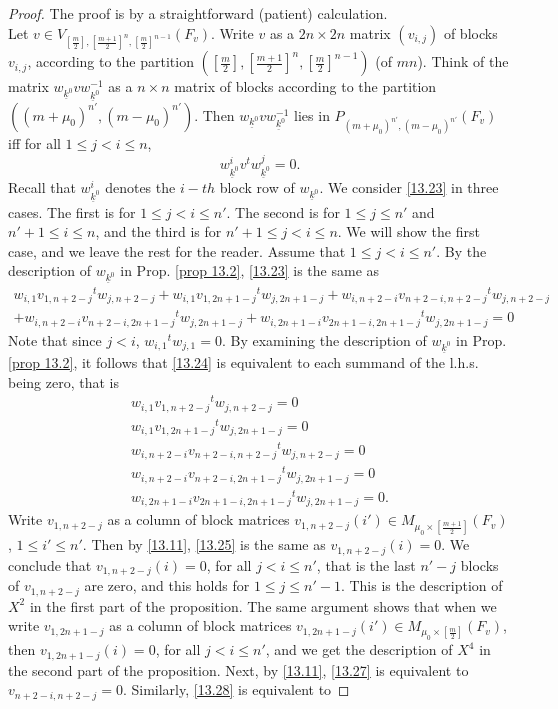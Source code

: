 \documentclass[12pts]{amsart}
\begin{document}
\begin{proof}
The proof is by a straightforward (patient) calculation.\\ 
Let $v\in V_{[\frac{m}{2}],[\frac{m+1}{2}]^n,[\frac{m}{2}]^{n-1}}(F_v)$. Write $v$ as a $2n\times 2n$ matrix $(v_{i,j})$ of blocks $v_{i,j}$, according to the partition $([\frac{m}{2}],[\frac{m+1}{2}]^n,[\frac{m}{2}]^{n-1})$ (of $mn$). Think of the matrix $w_{\underline{k}^0}vw^{-1}_{\underline{k}^0}$ as a $n\times n$ matrix of blocks according to the partition\\ $((m+\mu_0)^{n'},(m-\mu_0)^{n'})$. Then $w_{\underline{k}^0}vw^{-1}_{\underline{k}^0}$ lies in $P_{(m+\mu_0)^{n'},(m-\mu_0)^{n'}}(F_v)$ iff for all $1\leq j<i\leq n$,
\begin{equation}\label{13.23}
w^i_{\underline{k}^0}v{}^tw^j_{\underline{k}^0}=0.
\end{equation}
Recall that $w^i_{\underline{k}^0}$ denotes the $i-th$ block row of $w_{\underline{k}^0}$. We consider \eqref{13.23} in three cases. The first is for $1\leq j<i\leq n'$. The second is for $1\leq j\leq n'$ and $n'+1\leq i\leq n$, and the third is for $n'+1\leq j<i\leq n$. We will show the first case, and we leave the rest for the reader. Assume that $1\leq j<i\leq n'$. By the description of $w_{\underline{k}^0}$ in Prop. \ref{prop 13.2}, \eqref{13.23} is the same as
\begin{multline}\label{13.24}
w_{i,1}v_{1,n+2-j}{}^tw_{j,n+2-j}+w_{i,1}v_{1,2n+1-j}{}^tw_{j,2n+1-j}+
w_{i,n+2-i}v_{n+2-i,n+2-j}{}^tw_{j,n+2-j}\\
+w_{i,n+2-i}v_{n+2-i,2n+1-j}{}^tw_{j,2n+1-j}+w_{i,2n+1-i}v_{2n+1-i,2n+1-j}{}^tw_{j,2n+1-j}=0
\end{multline}	
Note that since $j<i$, $w_{i,1}{}^tw_{j,1}=0$. By examining the description of $w_{\underline{k}^0}$ in Prop. \ref{prop 13.2}, it follows that \eqref{13.24} is equivalent to each summand of the l.h.s. being zero, that is
\begin{eqnarray}
 w_{i,1}v_{1,n+2-j}{}^tw_{j,n+2-j}=0\label{13.25}\\
 w_{i,1}v_{1,2n+1-j}{}^tw_{j,2n+1-j}=0 \label{13.26}\\
 w_{i,n+2-i}v_{n+2-i,n+2-j}{}^tw_{j,n+2-j}=0 \label{13.27}\\
 w_{i,n+2-i}v_{n+2-i,2n+1-j}{}^tw_{j,2n+1-j}=0 \label{13.28} \\
 w_{i,2n+1-i}v_{2n+1-i,2n+1-j}{}^tw_{j,2n+1-j}=0 \label{13.29}.
\end{eqnarray}	
Write $v_{1,n+2-j}$ as a column of block matrices $v_{1,n+2-j}(i')\in M_{\mu_0\times [\frac{m+1}{2}]}(F_v)$, $1\leq i'\leq n'$. Then by \eqref{13.11}, \eqref{13.25} is the same as $v_{1,n+2-j}(i)=0$. We conclude that $v_{1,n+2-j}(i)=0$, for all $j<i\leq n'$, that is the last $n'-j$ blocks of $v_{1,n+2-j}$ are zero, and this holds for $1\leq j\leq n'-1$.	This is the description of $X^2$ in the first part of the proposition. The same argument shows that when we write $v_{1,2n+1-j}$ as a column of block matrices $v_{1,2n+1-j}(i')\in M_{\mu_0\times [\frac{m}{2}]}(F_v)$, then $v_{1,2n+1-j}(i)=0$, for all $j<i\leq n'$, and we get the description of $X^4$ in the second part of the proposition. Next, by \eqref{13.11}, \eqref{13.27} is equivalent to $v_{n+2-i,n+2-j}=0$. Similarly, \eqref{13.28} is equivalent to

\end{proof}
\end{document}
